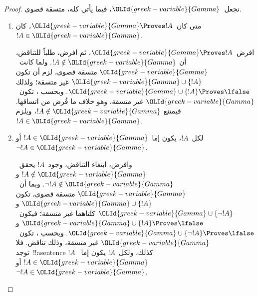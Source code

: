 \documentclass[../../../include/open-logic-section]{subfiles}
\begin{document}
\begin{proof}
نجعل~$\OLId{greek-variable}{Gamma}$، فيما يأتي كله، متسقة قصوى.
\begin{enumerate}
\item متى كان~$\OLId{greek-variable}{Gamma} \Proves !A$، كان~$!A \in \OLId{greek-variable}{Gamma}$.

افرض~$\OLId{greek-variable}{Gamma} \Proves !A$، ثم افرض، طلباً للتناقض، أن
$!A \notin \OLId{greek-variable}{Gamma}$. ولما كانت~$\OLId{greek-variable}{Gamma}$ متسقة قصوى، لزم أن تكون
$\OLId{greek-variable}{Gamma} \cup \{!A\}$ غير متسقة؛ ولذلك
$\OLId{greek-variable}{Gamma} \cup \{!A\} \Proves \lfalse$. وبحسب
،
تكون~$\OLId{greek-variable}{Gamma}$ غير متسقة، وهو خلاف ما فُرض من اتساقها. فيمتنع
$!A \notin \OLId{greek-variable}{Gamma}$، ويلزم~$!A \in \OLId{greek-variable}{Gamma}$.

\item لكل~$!A$، يكون إما~$!A \in \OLId{greek-variable}{Gamma}$ أو~$\lnot !A \in \OLId{greek-variable}{Gamma}$.

وافرض، ابتغاء التناقض، وجود~$!A$ يحقق~$!A \notin \OLId{greek-variable}{Gamma}$ و
$\lnot !A \notin \OLId{greek-variable}{Gamma}$. وبما أن~$\OLId{greek-variable}{Gamma}$ متسقة قصوى، تكون
$\OLId{greek-variable}{Gamma} \cup \{!A\}$ و$\OLId{greek-variable}{Gamma} \cup \{\lnot !A\}$ كلتاهما غير
متسقة؛ فيكون~$\OLId{greek-variable}{Gamma} \cup \{!A\} \Proves \lfalse$ و
$\OLId{greek-variable}{Gamma} \cup \{\lnot !A\} \Proves \lfalse$. وبحسب
،
تكون~$\OLId{greek-variable}{Gamma}$ غير متسقة، وذلك تناقض. فلا توجد~!!a{sentence}
$!A$ كذلك، ولكل~$!A$ يكون إما~$!A \in \OLId{greek-variable}{Gamma}$ أو
$\lnot !A \in \OLId{greek-variable}{Gamma}$.

\end{enumerate}
\end{proof}
\end{document}
